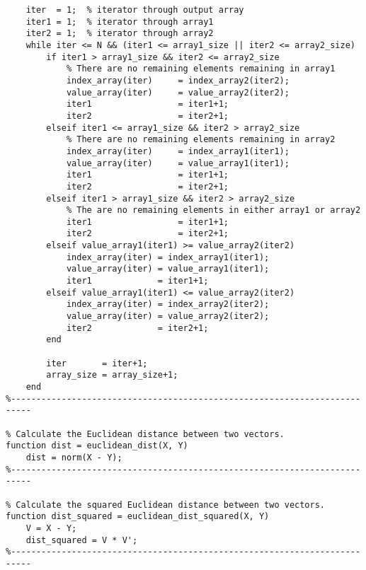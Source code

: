 \begin{lstlisting}
    iter  = 1;  % iterator through output array
    iter1 = 1;  % iterator through array1
    iter2 = 1;  % iterator through array2
    while iter <= N && (iter1 <= array1_size || iter2 <= array2_size)
        if iter1 > array1_size && iter2 <= array2_size
            % There are no remaining elements remaining in array1
            index_array(iter)     = index_array2(iter2);
            value_array(iter)     = value_array2(iter2);
            iter1                 = iter1+1;
            iter2                 = iter2+1;
        elseif iter1 <= array1_size && iter2 > array2_size
            % There are no remaining elements remaining in array2
            index_array(iter)     = index_array1(iter1);
            value_array(iter)     = value_array1(iter1);
            iter1                 = iter1+1;
            iter2                 = iter2+1;
        elseif iter1 > array1_size && iter2 > array2_size
            % The are no remaining elements in either array1 or array2
            iter1                 = iter1+1;
            iter2                 = iter2+1;
        elseif value_array1(iter1) >= value_array2(iter2)
            index_array(iter) = index_array1(iter1);
            value_array(iter) = value_array1(iter1);
            iter1             = iter1+1;
        elseif value_array1(iter1) <= value_array2(iter2)
            index_array(iter) = index_array2(iter2);
            value_array(iter) = value_array2(iter2);
            iter2             = iter2+1;
        end

        iter       = iter+1;
        array_size = array_size+1;
    end
%--------------------------------------------------------------------------

% Calculate the Euclidean distance between two vectors.
function dist = euclidean_dist(X, Y)
    dist = norm(X - Y);
%--------------------------------------------------------------------------

% Calculate the squared Euclidean distance between two vectors.
function dist_squared = euclidean_dist_squared(X, Y)
    V = X - Y;
    dist_squared = V * V';
%--------------------------------------------------------------------------
\end{lstlisting}
\lstset{language=Matlab}
